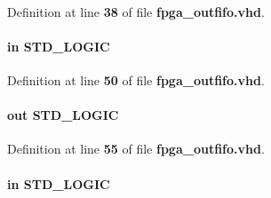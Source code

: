 \paragraph[{std\+\_\+logic\+\_\+1164}]{\hspace{0.3cm}{\ttfamily [Package]}}\label{classfpga__outfifo_acd03516902501cd1c7296a98e22c6fcb}


Definition at line {\bf 38} of file {\bf fpga\+\_\+outfifo.\+vhd}.

\paragraph[{wrclk}]{ {\bfseries \textcolor{keywordflow}{in}\textcolor{vhdlchar}{ }} {\bfseries \textcolor{comment}{S\+T\+D\+\_\+\+L\+O\+G\+IC}\textcolor{vhdlchar}{ }} \hspace{0.3cm}{\ttfamily [Port]}}\label{classfpga__outfifo_ae8620da6f493d83c5e8f213168b6ce6b}


Definition at line {\bf 50} of file {\bf fpga\+\_\+outfifo.\+vhd}.

\paragraph[{wrfull}]{ {\bfseries \textcolor{keywordflow}{out}\textcolor{vhdlchar}{ }} {\bfseries \textcolor{comment}{S\+T\+D\+\_\+\+L\+O\+G\+IC}\textcolor{vhdlchar}{ }} \hspace{0.3cm}{\ttfamily [Port]}}\label{classfpga__outfifo_a4f7f4dcba036fb2435435db13fbdea3a}


Definition at line {\bf 55} of file {\bf fpga\+\_\+outfifo.\+vhd}.

\paragraph[{wrreq}]{ {\bfseries \textcolor{keywordflow}{in}\textcolor{vhdlchar}{ }} {\bfseries \textcolor{comment}{S\+T\+D\+\_\+\+L\+O\+G\+IC}\textcolor{vhdlchar}{ }} \hspace{0.3cm}{\ttfamily [Port]}}\label{classfpga__outfifo_ae7e02414aa516307988efa17ff21d58c}


